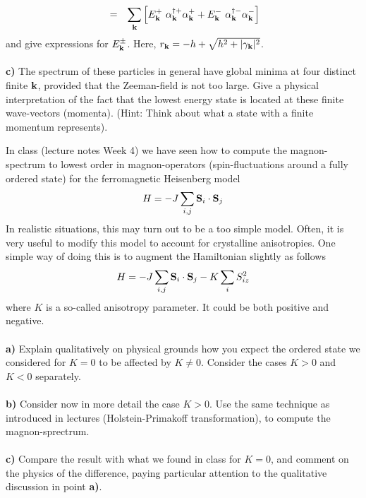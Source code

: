 \begin{problem}
\begin{eqnarray}
	& = &  \sum_{{\bf k}}  \left[  E^{+}_{{\bf k}} ~ \alpha^{\dagger +}_{{\bf k}} \alpha^{+}_{{\bf k}} 
	+ E^{-}_{{\bf k}} ~ \alpha^{\dagger -}_{{\bf k}} \alpha^{-}_{{\bf k}} \right]  \nonumber
\end{eqnarray}
and give expressions for $ E^{\pm}_{{\bf k}}$. Here, $r_{{\bf k}} =- h + \sqrt{h^2+|\gamma_{{\bf k}}|^2}$. 
\ \\
\ \\
{\bf c)} The spectrum of these particles in general have global minima at four distinct finite ${\bf k}$, provided that the Zeeman-field is not too large. Give 
a physical interpretation of the fact that the lowest energy state is located at these finite wave-vectors 
(momenta). (Hint: Think about what a state with a finite momentum represents). 
\end{problem}
\begin{problem}
In class (lecture notes Week 4) we have seen how to compute the magnon-spectrum to lowest order in magnon-operators (spin-fluctuations around a fully ordered state) for the ferromagnetic Heisenberg model 
\begin{eqnarray}
	H = - J \sum_{i,j} {\bf S}_i \cdot {\bf S}_j \nonumber
\end{eqnarray}
In realistic situations, this may turn out to be a too simple model. Often, it is very useful to modify this model to account for crystalline anisotropies. One simple way of doing this is to augment the Hamiltonian slightly as follows 
\begin{eqnarray}
	H = - J \sum_{i,j} {\bf S}_i \cdot {\bf S}_j  - K \sum_i S_{iz}^2 \nonumber
\end{eqnarray}
where $K$ is a so-called anisotropy parameter. It could be both positive and negative. 
\ \\
\ \\
{\bf a)} Explain qualitatively on physical grounds how you expect the ordered state we considered for $K=0$ to be affected by $K \neq 0$. Consider the cases $K > 0$ and $K < 0$ separately.
\ \\
\ \\
{\bf b)} Consider now in more detail the case $K > 0$. Use the same technique as introduced in lectures (Holstein-Primakoff transformation), to compute the magnon-sprectrum.
\ \\
\ \\
{\bf c)} Compare the result with what we found in class for $K=0$, and comment on the physics of the difference, paying particular attention to the qualitative discussion in point  {\bf a)}. 
\end{problem}

